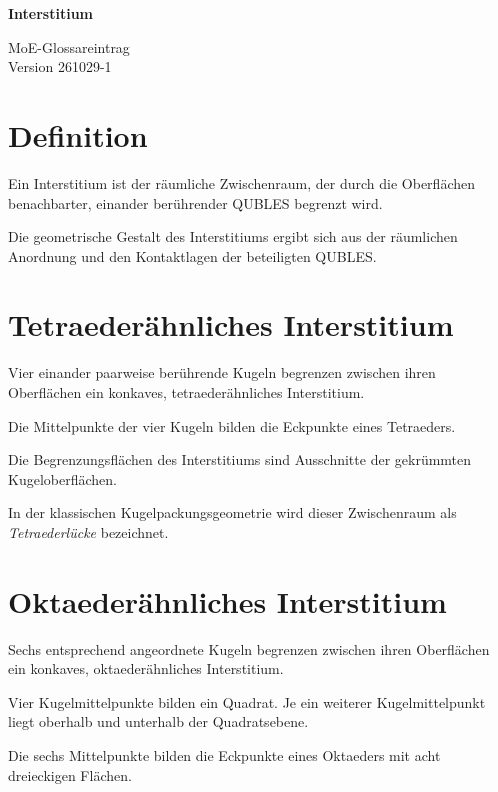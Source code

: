 \documentclass[11pt,a4paper]{article}
\begin{document}
\vspace*{-1.8cm}

\noindent
\begin{minipage}[t]{0.66\textwidth}
{\LARGE\bfseries Interstitium}
\end{minipage}
\hfill
\begin{minipage}[t]{0.30\textwidth}
\raggedleft
{\small MoE-Glossareintrag}\\
{\small Version 261029-1}
\end{minipage}

\vspace{1.4em}

\section*{Definition}

Ein Interstitium ist der räumliche Zwischenraum,
der durch die Oberflächen benachbarter, einander
berührender QUBLES begrenzt wird.

Die geometrische Gestalt des Interstitiums ergibt
sich aus der räumlichen Anordnung und den
Kontaktlagen der beteiligten QUBLES.

\section*{Tetraederähnliches Interstitium}

Vier einander paarweise berührende Kugeln
begrenzen zwischen ihren Oberflächen ein
konkaves, tetraederähnliches Interstitium.

Die Mittelpunkte der vier Kugeln bilden
die Eckpunkte eines Tetraeders.

Die Begrenzungsflächen des Interstitiums
sind Ausschnitte der gekrümmten
Kugeloberflächen.

In der klassischen Kugelpackungsgeometrie
wird dieser Zwischenraum als
\emph{Tetraederlücke} bezeichnet.

\section*{Oktaederähnliches Interstitium}

Sechs entsprechend angeordnete Kugeln
begrenzen zwischen ihren Oberflächen ein
konkaves, oktaederähnliches Interstitium.

Vier Kugelmittelpunkte bilden ein Quadrat.
Je ein weiterer Kugelmittelpunkt liegt
oberhalb und unterhalb der Quadratsebene.

Die sechs Mittelpunkte bilden die
Eckpunkte eines Oktaeders mit acht
dreieckigen Flächen.
\end{document}
